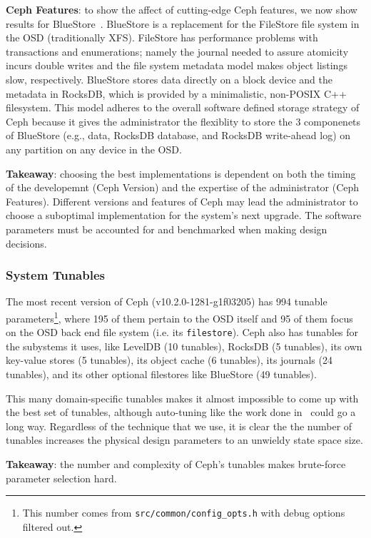\documentclass[10pt,twocolumn]{article}
\begin{document}
\textbf{Ceph Features}: to show the affect of cutting-edge Ceph features, we
now show results for BlueStore~\cite{weil:vault2016-bluestore}. BlueStore is a
replacement for the FileStore file system in the OSD (traditionally XFS).
FileStore has performance problems with transactions and enumerations; namely
the journal needed to assure atomicity incurs double writes and the file system
metadata model makes object listings slow, respectively. BlueStore stores data
directly on a block device and the metadata in RocksDB, which is provided by a
minimalistic, non-POSIX C++ filesystem. This model adheres to the overall
software defined storage strategy of Ceph because it gives the administrator
the flexiblity to store the 3 componenets of BlueStore (e.g., data, RocksDB
database, and RocksDB write-ahead log) on any partition on any device in the
OSD. 

\textbf{Takeaway}: choosing the best implementations is dependent on both the
timing of the developemnt (Ceph Version) and the expertise of the administrator
(Ceph Features). Different versions and features of Ceph may lead the
administrator to choose a suboptimal implementation for the system's next
upgrade. The software parameters must be accounted for and benchmarked when
making design decisions.

\subsubsection{System Tunables}

The most recent version of Ceph (v10.2.0-1281-g1f03205) has 994 tunable
parameters\footnote{This number comes from \texttt{src/common/config\_opts.h}
with debug options filtered out.}, where 195 of them pertain to the OSD itself
and 95 of them focus on the OSD back end file system (i.e. its
\texttt{filestore}). Ceph also has tunables for the subystems it uses, like
LevelDB (10 tunables), RocksDB (5 tunables), its own key-value stores (5
tunables), its object cache (6 tunables), its journals (24 tunables), and its
other optional filestores like BlueStore (49 tunables).

This many domain-specific tunables makes it almost impossible to come up with
the best set of tunables, although auto-tuning like the work done
in~\cite{behzad:sc2013-autotuning} could go a long way. Regardless of the
technique that we use, it is clear the the number of tunables increases the
physical design parameters to an unwieldy state space size.

\textbf{Takeaway}: the number and complexity of Ceph's tunables makes
brute-force parameter selection hard.
\end{document}
